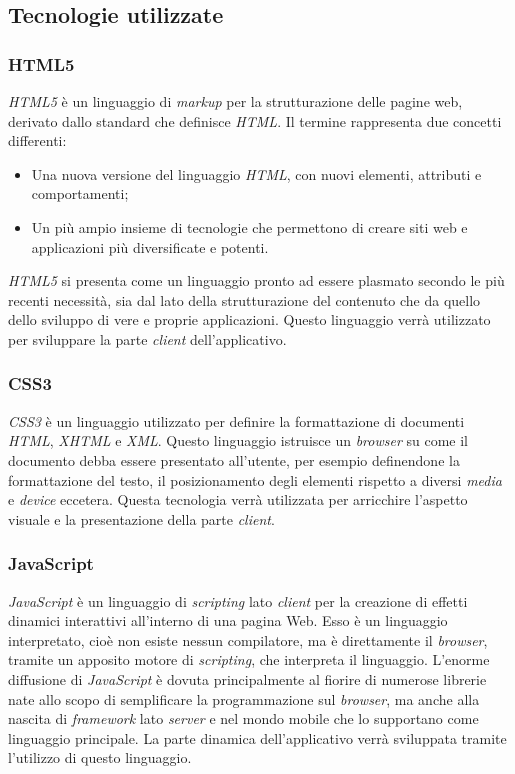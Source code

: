 \subsection{Tecnologie utilizzate}
\subsubsection{HTML5}
\textit{HTML5} è un linguaggio di \textit{markup} per la strutturazione delle pagine web, derivato dallo standard che definisce \textit{HTML}.
Il termine rappresenta due concetti differenti:
\begin{itemize}
		\item
			Una nuova versione del linguaggio \textit{HTML}, con nuovi elementi, attributi e comportamenti;
		\item
			Un più ampio insieme di tecnologie che permettono di creare siti web e applicazioni più diversificate e potenti.
\end{itemize}
\textit{HTML5} si presenta come un linguaggio pronto ad essere plasmato secondo le più recenti necessità, sia dal lato della strutturazione del contenuto che da quello dello sviluppo di vere e proprie applicazioni.
Questo linguaggio verrà utilizzato per sviluppare la parte \textit{client} dell'applicativo.

\subsubsection{CSS3}
\textit{CSS3} è un linguaggio utilizzato per definire la formattazione di documenti \textit{HTML}, \textit{XHTML} e \textit{XML}.
Questo linguaggio istruisce un \textit{browser} su come il documento debba essere presentato all'utente, per esempio definendone la formattazione del testo, il posizionamento degli elementi rispetto a diversi \textit{media} e \textit{device} eccetera.
Questa tecnologia verrà utilizzata per arricchire l'aspetto visuale e la presentazione della parte \textit{client}.

\subsubsection{JavaScript}
\textit{JavaScript} è un linguaggio di \textit{scripting} lato \textit{client} per la creazione di effetti dinamici interattivi all'interno di una pagina Web. Esso è un linguaggio interpretato, cioè non esiste nessun compilatore, ma è direttamente il \textit{browser}, tramite un apposito motore di \textit{scripting}, che interpreta il linguaggio.
L'enorme diffusione di \textit{JavaScript} è dovuta principalmente al fiorire di numerose librerie nate allo scopo di semplificare la programmazione sul \textit{browser}, ma anche alla nascita di \textit{framework} lato \textit{server} e nel mondo mobile che lo supportano come linguaggio principale.
La parte dinamica dell'applicativo verrà sviluppata tramite l'utilizzo di questo linguaggio.

